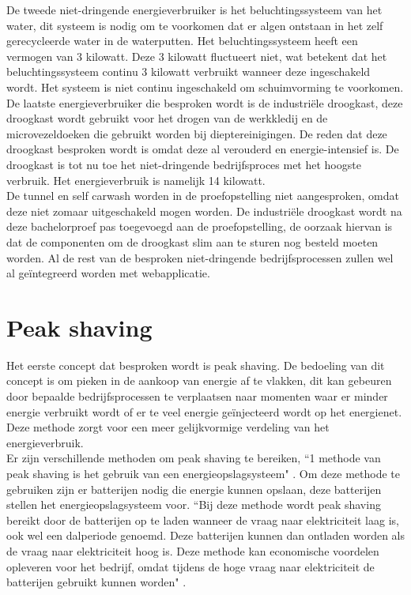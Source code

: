 De tweede niet-dringende energieverbruiker is het beluchtingssysteem van het water, dit systeem is nodig om te voorkomen dat er algen ontstaan in het zelf gerecycleerde water in de waterputten. Het beluchtingssysteem heeft een vermogen van 3 kilowatt. Deze 3 kilowatt fluctueert niet, wat betekent dat het beluchtingssysteem continu 3 kilowatt verbruikt wanneer deze ingeschakeld wordt. Het systeem is niet continu ingeschakeld om schuimvorming te voorkomen.\\

De laatste energieverbruiker die besproken wordt is de industriële droogkast, deze droogkast wordt gebruikt voor het drogen van de werkkledij en de microvezeldoeken die gebruikt worden bij dieptereinigingen. De reden dat deze droogkast besproken wordt is omdat deze al verouderd en energie-intensief is. De droogkast is tot nu toe het niet-dringende bedrijfsproces met het hoogste verbruik. Het energieverbruik is namelijk 14 kilowatt.\\

De tunnel en self carwash worden in de proefopstelling niet aangesproken, omdat deze niet zomaar uitgeschakeld mogen worden. De industriële droogkast wordt na deze bachelorproef pas toegevoegd aan de proefopstelling, de oorzaak hiervan is dat de componenten om de droogkast slim aan te sturen nog besteld moeten worden. Al de rest van de besproken niet-dringende bedrijfsprocessen zullen wel al geïntegreerd worden met webapplicatie. 

\section{Peak shaving}
\label{sec:stand-van-zaken-peak-shaving}

Het eerste concept dat besproken wordt is peak shaving. De bedoeling van dit concept is om pieken in de aankoop van energie af te vlakken, dit kan gebeuren door bepaalde bedrijfsprocessen te verplaatsen naar momenten waar er minder energie verbruikt wordt of er te veel energie geïnjecteerd wordt op het energienet. Deze methode zorgt voor een meer gelijkvormige verdeling van het energieverbruik.\\

Er zijn verschillende methoden om peak shaving te bereiken, “1 methode van peak shaving is het gebruik van een energieopslagsysteem" \autocite{UDDIN2018}. Om deze methode te gebruiken zijn er batterijen nodig die energie kunnen opslaan, deze batterijen stellen het energieopslagsysteem voor. “Bij deze methode wordt peak shaving bereikt door de batterijen op te laden wanneer de vraag naar elektriciteit laag is, ook wel een dalperiode genoemd. Deze batterijen kunnen dan ontladen worden als de vraag naar elektriciteit hoog is. Deze methode kan economische voordelen opleveren voor het bedrijf, omdat tijdens de hoge vraag naar elektriciteit de batterijen gebruikt kunnen worden" \autocite{UDDIN2018}.

